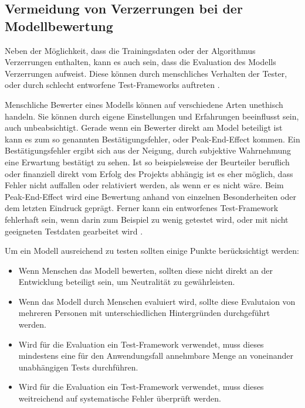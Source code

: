\documentclass[12pt]{report}
\begin{document}
\subsection{Vermeidung von Verzerrungen bei der Modellbewertung}
Neben der Möglichkeit, dass die Trainingsdaten oder der Algorithmus Verzerrungen enthalten, kann es auch sein, dass die Evaluation des Modells Verzerrungen aufweist.
Diese können durch menschliches Verhalten der Tester, oder durch schlecht entworfene Test-Frameworks auftreten \cite[S. 54f.]{Srinivasan}.

Menschliche Bewerter eines Modells können auf verschiedene Arten unethisch handeln. Sie können durch eigene Einstellungen und Erfahrungen beeinflusst sein, auch unbeabsichtigt.
Gerade wenn ein Bewerter direkt am Model beteiligt ist kann es zum so genannten Bestätigungsfehler, oder \glqq Peak-End-Effect\grqq{} kommen. Ein Bestätigungsfehler ergibt sich aus der Neigung, durch subjektive Wahrnehmung eine Erwartung bestätigt zu sehen. Ist so beispielsweise der Beurteiler beruflich oder finanziell direkt vom Erfolg des Projekts abhängig ist es eher möglich, dass Fehler nicht auffallen oder relativiert werden, als wenn er es nicht wäre.
Beim \glqq Peak-End-Effect\grqq{} wird eine Bewertung anhand von einzelnen Besonderheiten oder dem letzten Eindruck geprägt.
Ferner kann ein entworfenes Test-Framework fehlerhaft sein, wenn darin zum Beispiel zu wenig getestet wird, oder mit nicht geeigneten Testdaten gearbeitet wird \cite[S. 54f.]{Srinivasan}.

Um ein Modell ausreichend zu testen sollten einige Punkte berücksichtigt werden:
\begin{itemize}
    \item Wenn Menschen das Modell bewerten, sollten diese nicht direkt an der Entwicklung beteiligt sein, um Neutralität zu gewährleisten.
    \item Wenn das Modell durch Menschen evaluiert wird, sollte diese Evalutaion von mehreren Personen mit unterschiedlichen Hintergründen durchgeführt werden.
    \item Wird für die Evaluation ein Test-Framework verwendet, muss dieses mindestens eine für den Anwendungsfall annehmbare Menge an voneinander unabhängigen Tests durchführen.
    \item Wird für die Evaluation ein Test-Framework verwendet, muss dieses weitreichend auf systematische Fehler überprüft werden.
\end{itemize}
\end{document}
